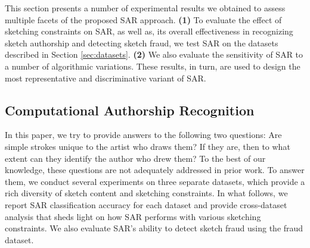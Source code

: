 This section presents a number of experimental results we obtained to assess multiple facets of the proposed SAR approach. \textbf{(1)} To evaluate the effect of sketching constraints on SAR, as well as, its overall effectiveness in recognizing sketch authorship and detecting sketch fraud, we test SAR on the datasets described in Section \ref{sec:datasets}. \textbf{(2)} We also evaluate the sensitivity of SAR to a number of algorithmic variations. These results, in turn, are used to design the most representative and discriminative variant of SAR. %

\vspace{-2mm}
\subsection{Computational Authorship Recognition}\label{subsec:recognition}
\vspace{-2mm}
In this paper, we try to provide answers to the following two questions: Are simple strokes unique to the artist who draws them?  If they are, then to what extent can they identify the author who drew them? To the best of our knowledge, these questions are not adequately addressed in prior work. To answer them, we conduct several experiments on three separate datasets, which provide a rich diversity of sketch content and sketching constraints. In what follows, we report SAR classification accuracy for each dataset and provide cross-dataset analysis that sheds light on how SAR performs with various sketching constraints. We also evaluate SAR's ability to detect sketch fraud using the fraud dataset.


